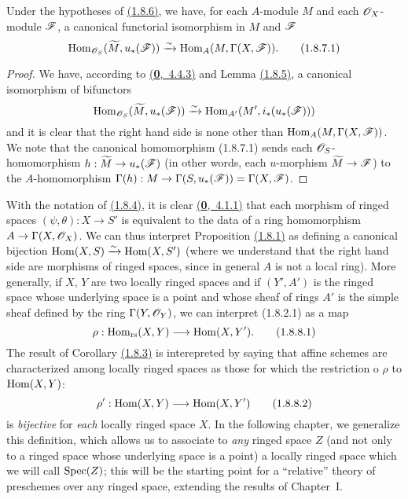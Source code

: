 \begin{cor}[1.8.7]
\label{cor-1.1.8.7}
Under the hypotheses of \hyperref[cor-1.1.8.6]{(1.8.6)}, we have, for each $A$-module $M$ and each
$\mathscr{O}_X$-module $\mathscr{F}$, a canonical functorial isomorphism in $M$ and $\mathscr{F}$
\[
  {\mathop{\mathrm{Hom}}\nolimits}_{\mathscr{O}_S}(\widetilde{M},u_*(\mathscr{F}))\xrightarrow{\sim}{\mathop{\mathrm{Hom}}\nolimits}_A(M,\Gamma(X,\mathscr{F})).
  \tag{1.8.7.1}
\]
\end{cor}

\begin{proof}
\label{proof-cor-1.1.8.7}
We have, according to \hyperref[env-0.4.4.3]{(\textbf{0},~4.4.3)} and Lemma \hyperref[lem-1.1.8.5]{(1.8.5)}, a canonical
isomorphism of bifunctors
\[
  {\mathop{\mathrm{Hom}}\nolimits}_{\mathscr{O}_S}(\widetilde{M},u_*(\mathscr{F}))\xrightarrow{\sim}{\mathop{\mathrm{Hom}}\nolimits}_{A'}(M',i_*(u_*(\mathscr{F})))
\]
and it is clear that the right hand side is none other than ${\mathop{\mathrm{Hom}}\nolimits}_A(M,\Gamma(X,\mathscr{F}))$. We
note that the canonical homomorphism (1.8.7.1) sends each $\mathscr{O}_S$-homomorphism
$h:\widetilde{M}\to u_*(\mathscr{F})$ (in other words, each $u$-morphism $\widetilde{M}\to\mathscr{F}$)
to the $A$-homomorphism $\Gamma(h):M\to\Gamma(S,u_*(\mathscr{F}))=\Gamma(X,\mathscr{F})$.
\end{proof}

\begin{env}[1.8.8]
\label{env-1.1.8.8}
With the notation of \hyperref[env-1.1.8.4]{(1.8.4)}, it is clear \hyperref[env-0.4.1.1]{(\textbf{0},~4.1.1)} that each morphism
of ringed spaces $(\psi,\theta):X\to S'$ is equivalent to the data of a ring homomorphism
$A\to\Gamma(X,\mathscr{O}_X)$. We can thus interpret Proposition \hyperref[prop-1.1.8.1]{(1.8.1)} as defining a canonical
bijection ${\mathop{\mathrm{Hom}}\nolimits}(X,S)\xrightarrow{\sim}{\mathop{\mathrm{Hom}}\nolimits}(X,S')$ (where we understand that the right hand side are
morphisms of ringed spaces, since in general $A$ is not a local ring). More generally, if
$X$, $Y$ are two locally ringed spaces and if $(Y',A')$ is the ringed space whose underlying
space is a point and whose sheaf of rings $A'$ is the simple sheaf defined by the
ring $\Gamma(Y,\mathscr{O}_Y)$, we can interpret (1.8.2.1) as a map
\[
  \rho:{\mathop{\mathrm{Hom}}\nolimits}_\text{rs}(X,Y)\longrightarrow{\mathop{\mathrm{Hom}}\nolimits}(X,Y').
  \tag{1.8.8.1}
\]
The result of Corollary \hyperref[cor-1.1.8.3]{(1.8.3)} is interepreted by saying that affine schemes are
characterized among locally ringed spaces as those for which the restriction o $\rho$ to
${\mathop{\mathrm{Hom}}\nolimits}(X,Y)$:
\[
  \rho':{\mathop{\mathrm{Hom}}\nolimits}(X,Y)\longrightarrow{\mathop{\mathrm{Hom}}\nolimits}(X,Y')
  \tag{1.8.8.2}
\]
is {\em bijective} for {\em each} locally ringed space $X$. In the following chapter, we
generalize this definition, which allows us to associate to {\em any} ringed space $Z$ (and
not only to a ringed space whose underlying space is a point) a locally ringed
space which we will call ${\mathop{\mathrm{Spec}}\nolimits}(Z)$; this will be the starting point for a ``relative''
theory of preschemes over any ringed space, extending the results of Chapter~I.
\end{env}

